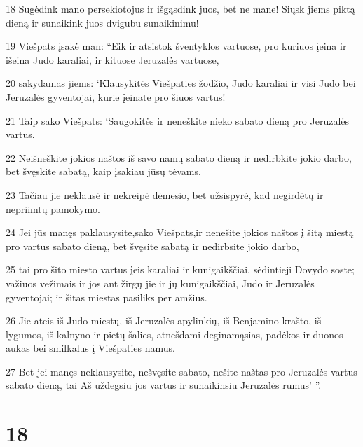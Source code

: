 \par 18 Sugėdink mano persekiotojus ir išgąsdink juos, bet ne mane! Siųsk jiems piktą dieną ir sunaikink juos dvigubu sunaikinimu! 
\par 19 Viešpats įsakė man: “Eik ir atsistok šventyklos vartuose, pro kuriuos įeina ir išeina Judo karaliai, ir kituose Jeruzalės vartuose, 
\par 20 sakydamas jiems: ‘Klausykitės Viešpaties žodžio, Judo karaliai ir visi Judo bei Jeruzalės gyventojai, kurie įeinate pro šiuos vartus! 
\par 21 Taip sako Viešpats: ‘Saugokitės ir neneškite nieko sabato dieną pro Jeruzalės vartus. 
\par 22 Neišneškite jokios naštos iš savo namų sabato dieną ir nedirbkite jokio darbo, bet švęskite sabatą, kaip įsakiau jūsų tėvams. 
\par 23 Tačiau jie neklausė ir nekreipė dėmesio, bet užsispyrė, kad negirdėtų ir nepriimtų pamokymo. 
\par 24 Jei jūs manęs paklausysite,­sako Viešpats,­ir nenešite jokios naštos į šitą miestą pro vartus sabato dieną, bet švęsite sabatą ir nedirbsite jokio darbo, 
\par 25 tai pro šito miesto vartus įeis karaliai ir kunigaikščiai, sėdintieji Dovydo soste; važiuos vežimais ir jos ant žirgų jie ir jų kunigaikščiai, Judo ir Jeruzalės gyventojai; ir šitas miestas pasiliks per amžius. 
\par 26 Jie ateis iš Judo miestų, iš Jeruzalės apylinkių, iš Benjamino krašto, iš lygumos, iš kalnyno ir pietų šalies, atnešdami deginamąsias, padėkos ir duonos aukas bei smilkalus į Viešpaties namus. 
\par 27 Bet jei manęs neklausysite, nešvęsite sabato, nešite naštas pro Jeruzalės vartus sabato dieną, tai Aš uždegsiu jos vartus ir sunaikinsiu Jeruzalės rūmus’ ”.



\chapter{18}


